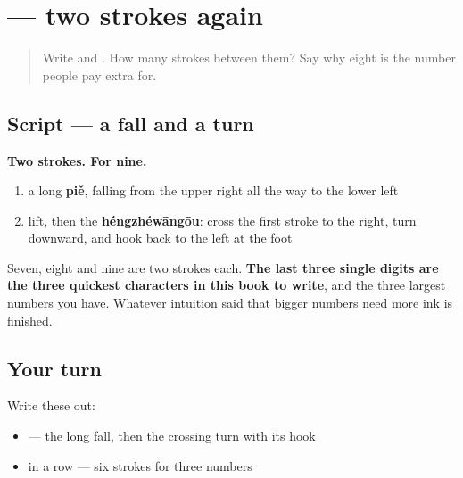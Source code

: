 \section[\texorpdfstring{\zh{九} (jiǔ)}{九 (jiǔ)}]{ — two strokes again}

\label{lesson:ZH-W20-jiu}



\begin{quote}
Write  and . How many strokes between them? Say why eight is the number people pay extra for.
\end{quote}

\subsection*{Script — a fall and a turn}

\begin{quote}
\end{quote}

\textbf{Two strokes. For nine.}

\begin{enumerate}
\raggedright
  \item a long \textbf{piě}, falling from the upper right all the way to the lower left
  \item lift, then the \textbf{héngzhéwāngōu}: cross the first stroke to the right, turn downward, and hook back to the left at the foot
\end{enumerate}

Seven, eight and nine are two strokes each. \textbf{The last three single digits are the three quickest characters in this book to write}, and the three largest numbers you have. Whatever intuition said that bigger numbers need more ink is finished.

\subsection*{Your turn}
Write these out:

\begin{itemize}
\raggedright
  \item {} — the long fall, then the crossing turn with its hook
  \item {}   in a row — six strokes for three numbers
\end{itemize}

